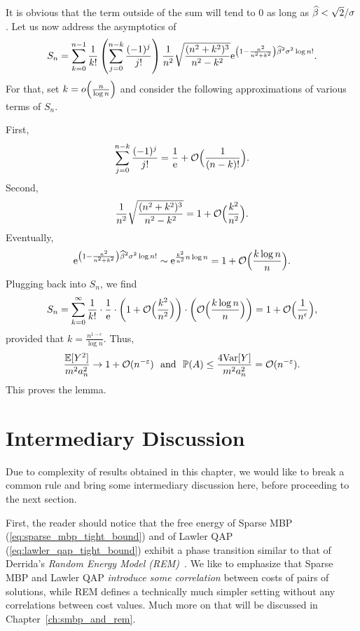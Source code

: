 It is obvious that the term outside of the sum will tend to $0$ as long as $\widehat{\beta}<\sqrt{2}/\sigma$.
Let us now address the asymptotics of 
\begin{equation}
S_n = 
\sum_{k=0}^{n-1} \frac{1}{k!}\left(\sum_{j=0}^{n-k}\frac{(-1)^j}{j!}\right)
\frac{1}{n^2}\sqrt{\frac{(n^2+k^2)^3}{n^2-k^2}}\mathrm{e}^{\left(1-\frac{n^2}
{n^2+k^2}\right)\widehat{\beta}^2\sigma^2\log n!}.
\end{equation}
For that, set $k = o\Bigl( \frac{n}{\log n}\Bigr)$ and consider the following 
approximations of various terms of $S_n$.

First,
\begin{equation}
  \sum_{j=0}^{n-k}\frac{(-1)^j}{j!} = \frac{1}{\mathrm{e}} + \mathcal{O} \Bigl( \frac{1}{(n-k)!}\Bigr).
\end{equation}
Second,
\begin{equation}
  \frac{1}{n^2}\sqrt{\frac{(n^2+k^2)^3}{n^2-k^2}} = 1 + 
\mathcal{O} \Bigl( \frac{k^2}{n^2}\Bigr).
\end{equation}
Eventually,
\begin{equation}
  \mathrm{e}^{\left(1-\frac{n^2}{n^2+k^2}\right)\widehat{\beta}^2\sigma^2\log n!} 
    \sim \mathrm{e}^{\frac{k^2}{n^2} n \log n} = 1 + \mathcal{O} \Bigl( \frac{k \log n}{n}\Bigr).
\end{equation}
Plugging back into $S_n$, we  find
\begin{equation}
 S_n = \sum_{k = 0}^{\infty} \frac{1}{k!} \cdot \frac{1}{\mathrm{e}} 
\cdot \biggl(1 + \mathcal{O}\Bigl( \frac{k^2}{n^2}\Bigr)\biggr) 
\cdot \biggl( \mathcal{O} \Bigl( \frac{k \log n}{n}\Bigr) \biggr) = 
1 + \mathcal{O} \Bigl(\frac{1}{n^\epsilon}\Bigr),
\end{equation}
provided that $k = \frac{n^{1-\epsilon}}{\log n}$.
Thus,
\begin{equation}
\frac{{\mathbb{E}}[Y^2]}{m^2a_n^2}\to 1+ \mathcal{O} (n^{-\varepsilon}) \,\,\text{ and }\,\, 
{\mathbb{P}}(A)\leq\frac{4{\mathrm{Var}}[Y]}{m^2a_n^2}=  \mathcal{O} (n^{-\varepsilon}).
\end{equation}
This proves the lemma.
\QEDA

\section{Intermediary Discussion}
\label{sec:free_experimental_mainresults}

Due to complexity of results obtained in this chapter, we would like to break
a common rule and bring some intermediary discussion here, before proceeding
to the next section.

First, the reader should notice that the free energy of Sparse MBP
(\ref{eq:sparse_mbp_tight_bound}) and of Lawler QAP
(\ref{eq:lawler_qap_tight_bound}) exhibit a phase transition similar to that of
Derrida's \textit{Random Energy Model (REM)}~\citep[][Section V]{derrida81}. We
like to emphasize that Sparse MBP and Lawler QAP \textit{introduce some
correlation} between costs of pairs of solutions, while REM defines a
technically much simpler setting without any correlations between cost values.
Much more on that will be discussed in Chapter~\ref{ch:smbp_and_rem}.

